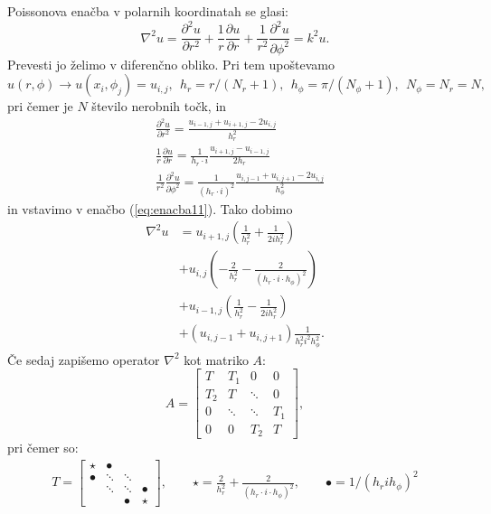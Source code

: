 \documentclass[12pt,a4paper]{article}
\begin{document}
\noindent Poissonova enačba v polarnih koordinatah se glasi:
\begin{equation} \label{eq:enacba11}
\nabla ^{2} u = \frac{\partial^{2} u }{\partial r^{2}} + \frac{1}{r} \frac{\partial u}{\partial r} + \frac{1}{r^{2}} \frac{\partial ^{2} u}{\partial \phi ^{2}}=k^{2} u.
\end{equation}
Prevesti jo želimo v diferenčno obliko. Pri tem upoštevamo
\begin{equation*}
u(r,\phi) \rightarrow u(x_i, \phi _j) = u_{i,j}, \ \  h_r = r/(N_r+1), \ \ h_{\phi}=\pi /(N_{\phi}+1), \ \  N_{\phi} = N_r=N,
\end{equation*}
pri čemer je $N$ število nerobnih točk, in
\begin{align*}
& \frac{\partial^{2} u }{\partial r^{2}} = \frac{u_{i-1,j} + u_{i+1,j} - 2u_{i,j} }{h_r ^{2}} \\
& \frac{1}{r} \frac{\partial u}{\partial r} = \frac{1}{h_r \cdot i} \frac{u_{i+1,j} - u_{i-1,j}}{2 h_r} \\
& \frac{1}{r^{2}} \frac{\partial ^{2} u}{\partial \phi ^{2}} = \frac{1}{(h_{r} \cdot i)^{2}} \frac{u_{i,j-1} + u_{i,j+1} - 2u_{i,j}}{h_{\phi} ^{2}}
\end{align*}
in vstavimo v enačbo  (\ref{eq:enacba11}). Tako dobimo
\begin{align}
\nabla ^{2} u & =  u_{i+1,j} \left( \frac{1}{h_r ^{2} } + \frac{1}{2ih_r ^{2}}  \right) \nonumber \\
& + u_{i,j} \left(  -\frac{2}{h_r ^{2}} - \frac{2}{(h_r \cdot i \cdot h_{\phi} )^{2}}    \right) \nonumber \\
& + u_{i-1,j} \left( \frac{1}{h_r ^{2} }  - \frac{1}{2i h_r ^{2}} \right) \nonumber \\
& + \left(u_{i,j-1} + u_{i,j+1}  \right) \frac{1}{h_r ^{2} i ^{2} h_{\phi}^{2} }.
\end{align}
Če sedaj zapišemo operator $\nabla ^{2}$ kot matriko $A$:
\begin{equation}
A=\begin{bmatrix}
T & T_1 & 0 & 0\\
T_2 & T & \ddots & 0\\
0 & \ddots & \ddots & T_1\\
0 & 0 & T_2 & T
\end{bmatrix},
\end{equation}
pri čemer so:
\begin{align*}
T= \begin{bmatrix}
\star & \bullet &  & \\
\bullet & \ddots & \ddots & \\
 & \ddots & \ddots & \bullet\\
 &  & \bullet & \star
\end{bmatrix}, \qquad \star = \frac{2}{h_r ^{2}} + \frac{2}{(h_r \cdot i \cdot h_{\phi} )^{2}}, \qquad \bullet= 1/(h_r i h_{\phi})^{2}
\end{align*}
\end{document}
